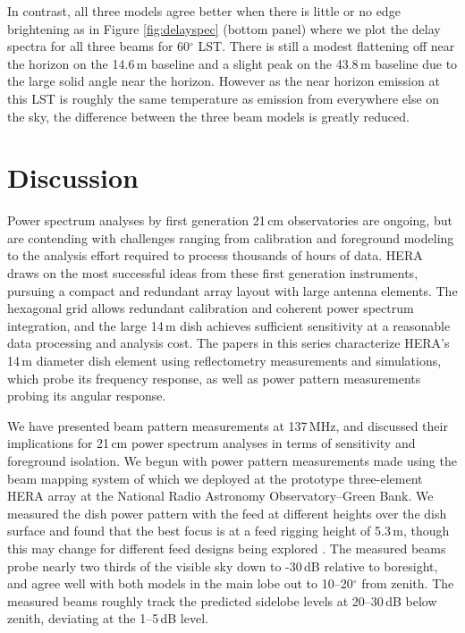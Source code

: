 In contrast, all three models agree better when there is little or no edge brightening as in Figure \ref{fig:delayspec} (bottom panel) where we plot the delay spectra for all three beams for 60$^\circ$ LST. There is still a modest flattening off near the horizon on the 14.6\,m baseline and a slight peak on the 43.8\,m baseline due to the large solid angle near the horizon. However as the near horizon emission at this LST is roughly the same temperature as emission from everywhere else on the sky, the difference between the three beam models is greatly reduced.

\section{Discussion}

Power spectrum analyses by first generation 21\,cm observatories are ongoing, but are contending with challenges ranging from calibration and foreground modeling to the analysis effort required to process thousands of hours of data. HERA draws on the most successful ideas from these first generation instruments, pursuing a compact and redundant array layout with large antenna elements. The hexagonal grid allows redundant calibration and coherent power spectrum integration, and the large 14\,m dish achieves sufficient sensitivity at a reasonable data processing and analysis cost. The papers in this series characterize HERA's 14\,m diameter dish element using reflectometry measurements and simulations, which probe its frequency response, as well as power pattern measurements probing its angular response. 

We have presented beam pattern measurements at 137\,MHz, and discussed their implications for 21\,cm power spectrum analyses in terms of sensitivity and foreground isolation. We begun with power pattern measurements made using the beam mapping system of \citet{neben15} which we deployed at the prototype three-element HERA array at the National Radio Astronomy Observatory--Green Bank. We measured the dish power pattern with the feed at different heights over the dish surface and found that the best focus is at a feed rigging height of 5.3\,m, though this may change for different feed designs being explored \citep{feedoptimizationmemo}. The measured beams probe nearly two thirds of the visible sky down to -30\,dB relative to boresight, and agree well with both models in the main lobe out to 10--20$^\circ$ from zenith. The measured beams roughly track the predicted sidelobe levels at 20--30\,dB below zenith, deviating at the 1--5\,dB level.

